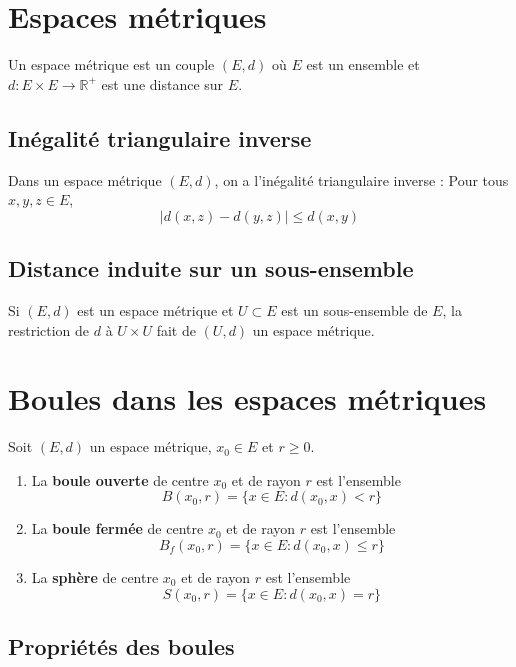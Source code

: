 \documentclass[oneside]{book}
\begin{document}
\section{Espaces métriques}

\begin{definition}
Un espace métrique est un couple $(E, d)$ où $E$ est un ensemble et $d : E \times E \to \mathbb{R}^+$ est une distance sur $E$.
\end{definition}

\subsection{Inégalité triangulaire inverse}
Dans un espace métrique $(E, d)$, on a l'inégalité triangulaire inverse :
Pour tous $x, y, z \in E$,
\[
|d(x, z) - d(y, z)| \leq d(x, y)
\]

\subsection{Distance induite sur un sous-ensemble}
Si $(E, d)$ est un espace métrique et $U \subset E$ est un sous-ensemble de $E$, la restriction de $d$ à $U \times U$ fait de $(U, d)$ un espace métrique.

\section{Boules dans les espaces métriques}

Soit $(E, d)$ un espace métrique, $x_0 \in E$ et $r \geq 0$.

\begin{definition}
\begin{enumerate}
    \item La \textbf{boule ouverte} de centre $x_0$ et de rayon $r$ est l'ensemble
    \[
    B(x_0, r) = \{x \in E : d(x_0, x) < r\}
    \]
    \item La \textbf{boule fermée} de centre $x_0$ et de rayon $r$ est l'ensemble
    \[
    B_f(x_0, r) = \{x \in E : d(x_0, x) \leq r\}
    \]
    \item La \textbf{sphère} de centre $x_0$ et de rayon $r$ est l'ensemble
    \[
    S(x_0, r) = \{x \in E : d(x_0, x) = r\}
    \]
\end{enumerate}
\end{definition}

\subsection{Propriétés des boules}
\end{document}
